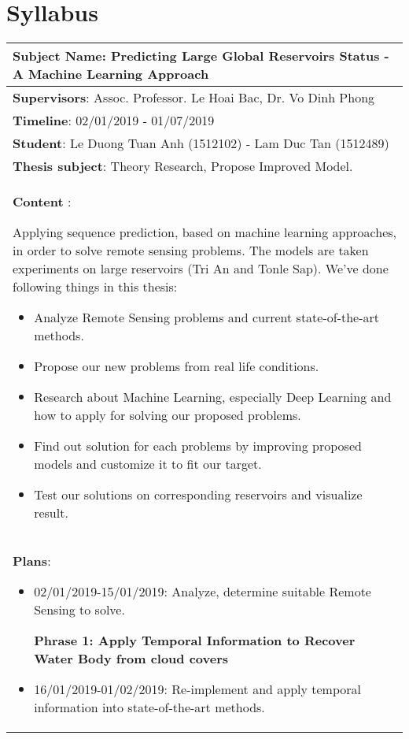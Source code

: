 \chapter{Syllabus}
\begin{longtable}{|l|c|}
\hline
\multicolumn{2}{|m{\linewidth}|}{\textbf{Subject Name}: Predicting Large Global Reservoirs Status - A Machine Learning Approach
}\\
\hline
\multicolumn{2}{|m{\linewidth}|}{\textbf{Supervisors}: Assoc. Professor. Le Hoai Bac, Dr. Vo Dinh Phong} \\
\hline
\multicolumn{2}{|m{\linewidth}|}{\textbf{Timeline}: 02/01/2019 - 01/07/2019}\\
\hline
\multicolumn{2}{|m{\linewidth}|}{\textbf{Student}: Le Duong Tuan Anh (1512102) - Lam Duc Tan (1512489)}\\
\hline
\multicolumn{2}{|m{\linewidth}|}{\textbf{Thesis subject}: Theory Research, Propose Improved Model.}\\
\hline
\multicolumn{2}{|m{\linewidth}|}{\textbf{Content} :\par
Applying sequence prediction, based on machine learning approaches, in order to solve remote sensing problems. The models are taken experiments on large reservoirs (Tri An and Tonle Sap). We've done following things in this thesis: \par
\begin{itemize}
	\item Analyze Remote Sensing problems and current state-of-the-art methods.
	\item Propose our new problems from real life conditions.
	\item Research about Machine Learning, especially Deep Learning and how to apply for solving our proposed problems.
	\item Find out solution for each problems by improving proposed models and customize it to fit our target. 
	\item Test our solutions on corresponding reservoirs and visualize result.
\end{itemize}}\\
\hline
\multicolumn{2}{|m{\linewidth}|}{\textbf{Plans}:
\begin{itemize}
	\item 02/01/2019-15/01/2019: Analyze, determine suitable Remote Sensing to solve.
	\par
	\textbf{Phrase 1: Apply Temporal Information to Recover Water Body from cloud covers}
	\item 16/01/2019-01/02/2019: Re-implement and apply temporal information into state-of-the-art methods. 

\end{itemize}}
\end{longtable}
